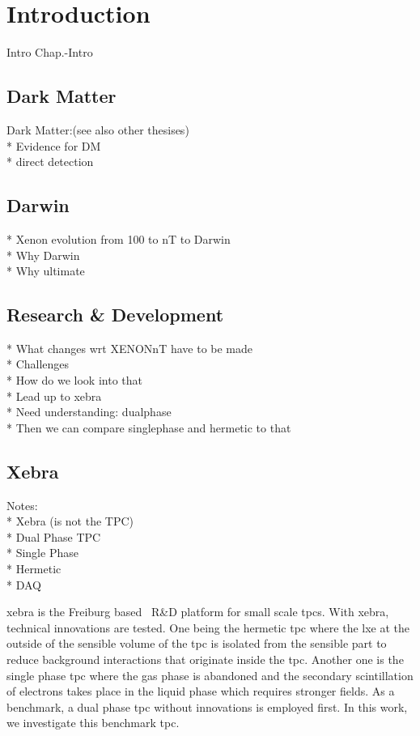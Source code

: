 \chapter{Introduction}
\label{chap:Intro}

Intro Chap.-Intro

\FloatBarrier
\section{Dark Matter}
\label{sec:DarkMatter}
\FloatBarrier

Dark Matter:(see also other thesises) \\
* Evidence for DM \\
* direct detection


\newpage
\FloatBarrier
\section{Darwin}
\label{sec:Darwin}
\FloatBarrier

* Xenon evolution from 100 to nT to Darwin \\
* Why Darwin \\
* Why ultimate


\newpage
\FloatBarrier
\section{Research \& Development}
\label{sec:RnD}
\FloatBarrier

* What changes wrt XENONnT have to be made \\
* Challenges \\
* How do we look into that \\
* Lead up to xebra \\
* Need understanding: dualphase \\
* Then we can compare singlephase and hermetic to that


\newpage
\FloatBarrier
\section{Xebra}
\label{sec:Xebra}
\FloatBarrier

Notes: \\
* Xebra (is not the TPC) \\
* Dual Phase TPC \\
* Single Phase \\
* Hermetic \\
* DAQ

\gls{xebra} is the Freiburg based \darwin~R\&D platform for small scale \glspl{tpc}.
With \gls{xebra}, technical innovations are tested.
One being the hermetic \gls{tpc} where the \gls{lxe} at the outside of the sensible volume of the \gls{tpc} is isolated from the sensible part to reduce background interactions that originate inside the \gls{tpc}.
Another one is the single phase \gls{tpc} where the gas phase is abandoned and the secondary scintillation of electrons takes place in the liquid phase which requires stronger fields.
As a benchmark, a dual phase \gls{tpc} without innovations is employed first.
In this work, we investigate this benchmark \gls{tpc}.

